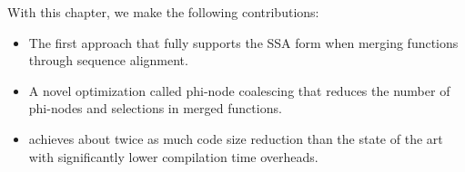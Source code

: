With this chapter, we make the following contributions:
\begin{itemize}
  \item The first approach that fully supports the SSA form when merging functions through sequence alignment.
  \item A novel optimization called phi-node coalescing that reduces the number of phi-nodes and selections in merged functions.
  \item {\ProjName} achieves about twice as much code size reduction than the state of the art with significantly lower compilation time
        overheads.
\end{itemize}








